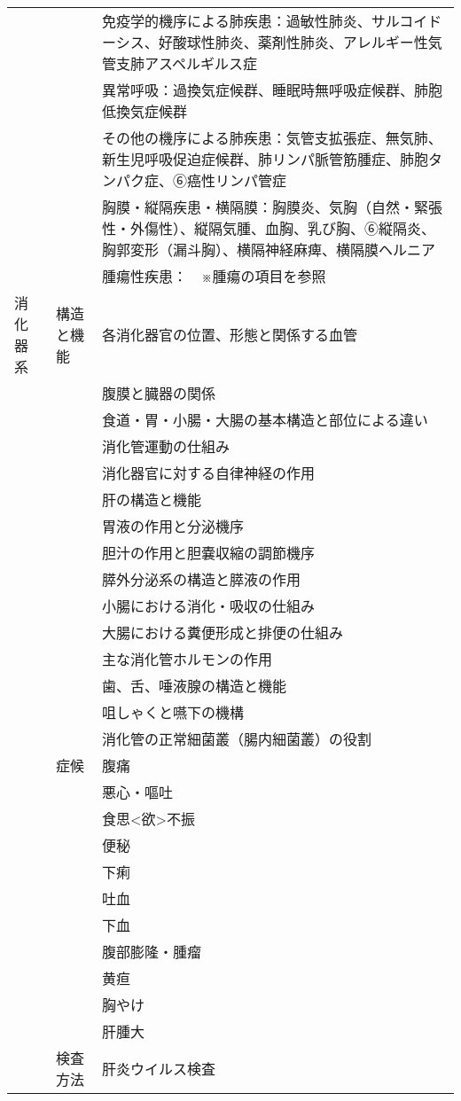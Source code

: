 \documentclass[
]{ltjsarticle}
\begin{document}
\begin{xltabular}{\linewidth}{XXX}
 &  & 免疫学的機序による肺疾患：過敏性肺炎、サルコイドーシス、好酸球性肺炎、薬剤性肺炎、アレルギー性気管支肺アスペルギルス症 \\
 &  & 異常呼吸：過換気症候群、睡眠時無呼吸症候群、肺胞低換気症候群 \\
 &  & その他の機序による肺疾患：気管支拡張症、無気肺、新生児呼吸促迫症候群、肺リンパ脈管筋腫症、肺胞タンパク症、➅癌性リンパ管症 \\
 &  & 胸膜・縦隔疾患・横隔膜：胸膜炎、気胸（自然・緊張性・外傷性）、縦隔気腫、血胸、乳び胸、➅縦隔炎、胸郭変形（漏斗胸）、横隔神経麻痺、横隔膜ヘルニア \\
 &  & 腫瘍性疾患：　※腫瘍の項目を参照 \\
消化器系 & 構造と機能 & 各消化器官の位置、形態と関係する血管 \\
 &  & 腹膜と臓器の関係 \\
 &  & 食道・胃・小腸・大腸の基本構造と部位による違い \\
 &  & 消化管運動の仕組み \\
 &  & 消化器官に対する自律神経の作用 \\
 &  & 肝の構造と機能 \\
 &  & 胃液の作用と分泌機序 \\
 &  & 胆汁の作用と胆嚢収縮の調節機序 \\
 &  & 膵外分泌系の構造と膵液の作用 \\
 &  & 小腸における消化・吸収の仕組み \\
 &  & 大腸における糞便形成と排便の仕組み \\
 &  & 主な消化管ホルモンの作用 \\
 &  & 歯、舌、唾液腺の構造と機能 \\
 &  & 咀しゃくと嚥下の機構 \\
 &  & 消化管の正常細菌叢（腸内細菌叢）の役割 \\
 & 症候 & 腹痛 \\
 &  & 悪心・嘔吐 \\
 &  & 食思<欲>不振 \\
 &  & 便秘 \\
 &  & 下痢 \\
 &  & 吐血 \\
 &  & 下血 \\
 &  & 腹部膨隆・腫瘤 \\
 &  & 黄疸 \\
 &  & 胸やけ \\
 &  & 肝腫大 \\
 & 検査方法 & 肝炎ウイルス検査 \\

\end{xltabular}
\end{document}
